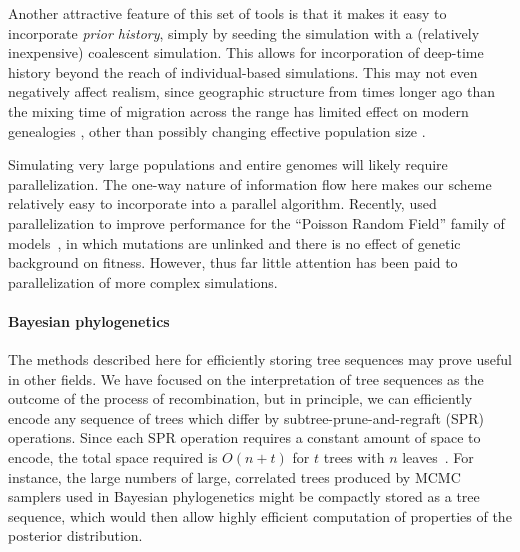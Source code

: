 \documentclass{article}
\begin{document}

Another attractive feature of this set of tools
is that it makes it easy to incorporate \emph{prior history},
simply by seeding the simulation with a (relatively inexpensive) coalescent simulation.
This allows for incorporation of deep-time history beyond the reach of individual-based simulations.
This may not even negatively affect realism,
since geographic structure from times longer ago than the mixing
time of migration across the range has limited effect on modern genealogies
\citep{wilkins2004separation},
other than possibly changing effective population size \citep{barton2002neutral,cox2002stepping}.

Simulating very large populations and entire genomes will likely require parallelization.
The one-way nature of information flow here makes our scheme relatively easy to incorporate
into a parallel algorithm.
Recently, \citet{lawrie2017accelerating} used parallelization
to improve performance for the ``Poisson Random Field'' family of models~\citep{Sawyer1992-jw},
in which mutations are unlinked and there is no effect of genetic background on fitness.
However, thus far little attention has been paid to parallelization of more complex simulations.

\paragraph{Bayesian phylogenetics}
The methods described here for efficiently storing tree sequences may prove useful in other fields.
We have focused on the interpretation of tree sequences as the outcome of the process
of recombination, but in principle, we can efficiently encode any
sequence of trees which differ by subtree-prune-and-regraft
(SPR) operations. Since each SPR operation requires a constant amount of space to encode, the total
space required is $O(n + t)$ for $t$ trees with $n$ leaves~\citep{kelleher2016efficient}.
For instance, the large numbers of large, correlated trees produced by
MCMC samplers used in Bayesian phylogenetics \citep[e.g.,][]{drummond2012bayesian}
might be compactly stored as a tree sequence,
which would then allow highly efficient computation of properties of the posterior distribution.
\end{document}
